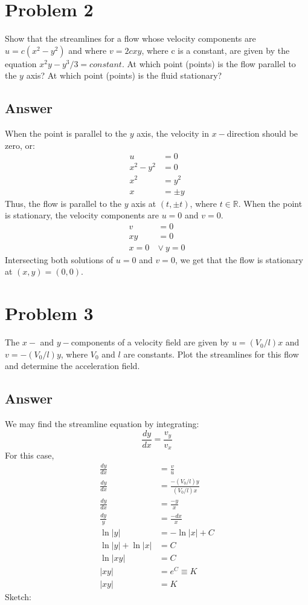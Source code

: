 \documentclass{article}
\begin{document}
\section*{Problem 2}
Show that the streamlines for a flow whose velocity components are $u = c(x^2 - y^2)$ and where $v = 2cxy$, where c is a constant, are given by the equation $x^2 y - y^3 / 3 = constant$. At which point (points) is the flow parallel to the $y$ axis? At which point (points) is the fluid stationary?

\subsection*{Answer}
When the point is parallel to the $y$ axis, the velocity in $x-$direction should be zero, or:
\begin{align*}
    u &= 0 \\
    x^2 - y^2 &= 0 \\
    x^2 &= y^2 \\
    x &= \pm y
\end{align*}
Thus, the flow is parallel to the $y$ axis at $(t, \pm t)$, where $t \in \mathbb{R}$.
When the point is stationary, the velocity components are $u = 0$ and $v = 0$. 
\begin{align*}
    v &= 0 \\
    xy &= 0 \\
    x = 0\ &\vee\ y = 0
\end{align*}
Intersecting both solutions of $u = 0$ and $v = 0$, we get that the flow is stationary at $(x, y) = (0, 0)$.

\newpage

\section*{Problem 3}
The $x-$ and $y-$components of a velocity field are given by $u = (V_0 / l)x$ and $v = -(V_0 / l)y$, where $V_0$ and $l$ are constants. Plot the streamlines for this flow and determine the acceleration field.

\subsection*{Answer}
We may find the streamline equation by integrating:
\begin{equation}
    \frac{dy}{dx} = \frac{v_y}{v_x}
\end{equation}
For this case,
\begin{align*}
    \frac{dy}{dx} &= \frac{v}{u} \\
    \frac{dy}{dx} &= \frac{-(V_0 / l)y}{(V_0 / l)x} \\
    \frac{dy}{dx} &= \frac{-y}{x} \\
    \frac{dy}{y} &= \frac{-dx}{x} \\
    \ln{|y|} &= -\ln{|x|} + C \\
    \ln{|y|} + \ln{|x|} &= C \\
    \ln{|xy|} &= C \\ 
    |xy| &= e^C \equiv K \\
    |xy| &= K
\end{align*}
Sketch:
\end{document}
